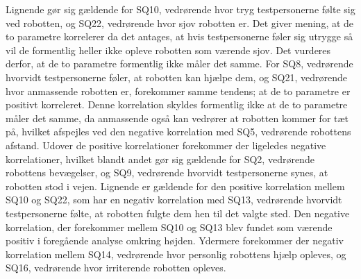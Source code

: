 Lignende gør sig gældende for SQ10, vedrørende hvor tryg testpersonerne følte sig ved robotten, og SQ22, vedrørende hvor sjov robotten er. Det giver mening, at de to parametre korrelerer da det antages, at hvis testpersonerne føler sig utrygge så vil de formentlig heller ikke opleve robotten som værende sjov. Det vurderes derfor, at de to parametre formentlig ikke måler det samme. For SQ8, vedrørende hvorvidt testpersonerne føler, at robotten kan hjælpe dem, og SQ21, vedrørende hvor anmassende robotten er, forekommer samme tendens; at de to parametre er positivt korreleret. Denne korrelation skyldes formentlig ikke at de to parametre måler det samme, da anmassende også kan vedrører at robotten kommer for tæt på, hvilket afspejles ved den negative korrelation med SQ5, vedrørende robottens afstand. \blankline
%
Udover de positive korrelationer forekommer der ligeledes negative korrelationer, hvilket blandt andet gør sig gældende for SQ2, vedrørende robottens bevægelser, og SQ9, vedrørende hvorvidt testpersonerne synes, at robotten stod i vejen. Lignende er gældende for den positive korrelation mellem SQ10 og SQ22, som har en negativ korrelation med SQ13, vedrørende hvorvidt testpersonerne følte, at robotten fulgte dem hen til det valgte sted. Den negative korrelation, der forekommer mellem SQ10 og SQ13 blev fundet som værende positiv i foregående analyse omkring højden. Ydermere forekommer der negativ korrelation mellem SQ14, vedrørende hvor personlig robottens hjælp opleves, og SQ16, vedrørende hvor irriterende robotten opleves. 

